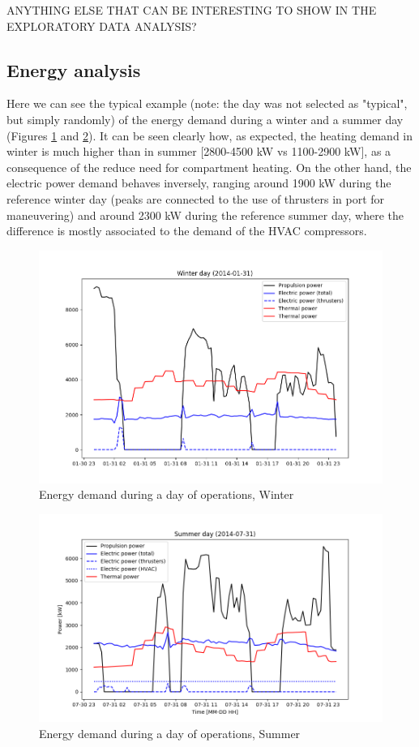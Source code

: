 \documentclass[preprint,12pt]{elsarticle}
\begin{document}
ANYTHING ELSE THAT CAN BE INTERESTING TO SHOW IN THE EXPLORATORY DATA ANALYSIS?




\subsection{Energy analysis} \label{sec:res:energy}

Here we can see the typical example (note: the day was not selected as "typical", but simply randomly) of the energy demand during a winter and a summer day (Figures \ref{fig:Demand_vs_time_W} and \ref{fig:Demand_vs_time_S}). It can be seen clearly how, as expected, the heating demand in winter is much higher than in summer [2800-4500 kW vs 1100-2900 kW], as a consequence of the reduce need for compartment heating. On the other hand, the electric power demand behaves inversely, ranging around 1900 kW during the reference winter day (peaks are connected to the use of thrusters in port for maneuvering) and around 2300 kW during the reference summer day, where the difference is mostly associated to the demand of the HVAC compressors. 



\begin{figure}[htbp]
	\centering
	\includegraphics[width=0.9\linewidth]{Figures/Demand_vs_time_W}
	\caption{Energy demand during a day of operations, Winter}
	\label{fig:Demand_vs_time_W}
\end{figure}

\begin{figure}[htbp]
	\centering
	\includegraphics[width=0.9\linewidth]{Figures/Demand_vs_time_S}
	\caption{Energy demand during a day of operations, Summer}
	\label{fig:Demand_vs_time_S}
\end{figure}
\end{document}
